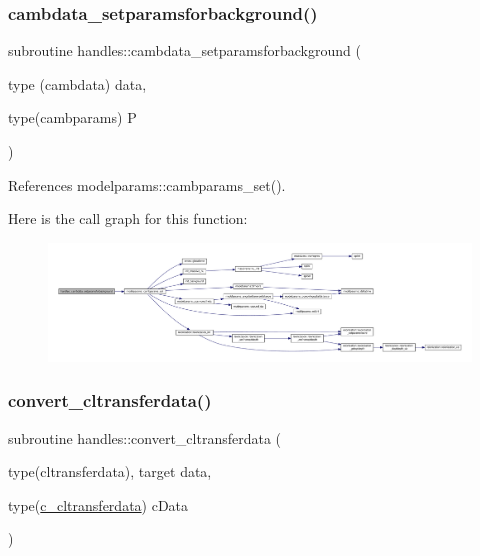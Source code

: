 \mbox{\label{namespacehandles_a4bdaf08397a5abc493ea901b3a53ece5}} 
\subsubsection{\texorpdfstring{cambdata\+\_\+setparamsforbackground()}{cambdata\_setparamsforbackground()}}
{\footnotesize\ttfamily subroutine handles\+::cambdata\+\_\+setparamsforbackground (\begin{DoxyParamCaption}\item[{type (cambdata)}]{data,  }\item[{type(cambparams)}]{P }\end{DoxyParamCaption})}



References modelparams\+::cambparams\+\_\+set().

Here is the call graph for this function\+:
\nopagebreak
\begin{figure}[H]
\begin{center}
\leavevmode
\includegraphics[width=350pt]{namespacehandles_a4bdaf08397a5abc493ea901b3a53ece5_cgraph}
\end{center}
\end{figure}
\mbox{\label{namespacehandles_abfc0adee06cc42379adb5fee674a9611}} 
\subsubsection{\texorpdfstring{convert\+\_\+cltransferdata()}{convert\_cltransferdata()}}
{\footnotesize\ttfamily subroutine handles\+::convert\+\_\+cltransferdata (\begin{DoxyParamCaption}\item[{type(cltransferdata), target}]{data,  }\item[{type(\mbox{\hyperlink{structhandles_1_1c__cltransferdata}{c\+\_\+cltransferdata}})}]{c\+Data }\end{DoxyParamCaption})}



